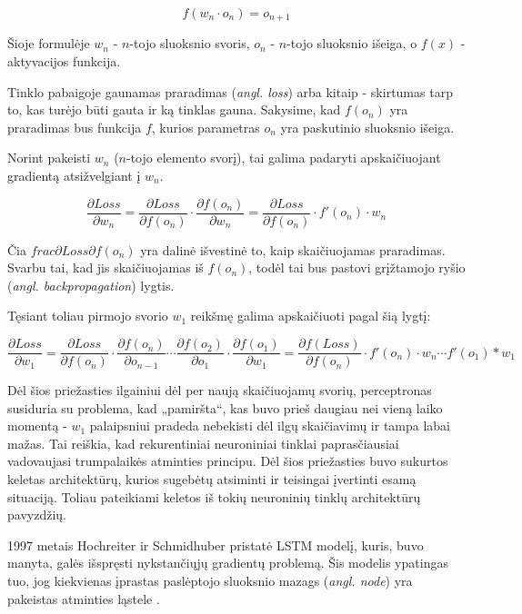 \documentclass{VUMIFPSbakalaurinis}
\begin{document}
\begin{equation}
	f(w_n \cdot o_n)=o_{n+1}
\end{equation}

Šioje formulėje $w_n$ - $n$-tojo sluoksnio svoris, $o_n$ - $n$-tojo sluoksnio išeiga, o $f(x)$ - aktyvacijos funkcija.

Tinklo pabaigoje gaunamas praradimas (\textit{angl. loss}) arba kitaip - skirtumas tarp to, kas turėjo būti gauta ir ką tinklas gauna. Sakysime, kad $f(o_n)$ yra praradimas bus funkcija $f$, kurios parametras $o_n$ yra paskutinio sluoksnio išeiga.

Norint pakeisti $w_n$ ($n$-tojo elemento svorį), tai galima padaryti apskaičiuojant gradientą atsižvelgiant į $w_n$.

\begin{equation}
	\frac{\partial Loss}{\partial w_n} = \frac{\partial Loss}{\partial f(o_n)} \cdot \frac{\partial f(o_n)}{\partial w_n} = \frac{\partial Loss}{\partial f(o_n)} \cdot f'(o_n) \cdot w_n
\end{equation}

Čia $frac{\partial Loss}{\partial f(o_n)}$ yra dalinė išvestinė to, kaip skaičiuojamas praradimas. Svarbu tai, kad jis skaičiuojamas iš $f(o_n)$, todėl tai bus pastovi grįžtamojo ryšio (\textit{angl. backpropagation}) lygtis.

Tęsiant toliau pirmojo svorio $w_1$ reikšmę galima apskaičiuoti pagal šią lygtį:

\begin{equation}
\frac{\partial Loss}{\partial w_1} = \frac{\partial Loss}{\partial f(o_n)} \cdot \frac{\partial f(o_n)}{\partial o_{n-1}} \cdots \frac{\partial f(o_2)}{\partial o_1} \cdot \frac{\partial f(o_1)}{\partial w_1} = \frac{\partial f(Loss)}{\partial f(o_n)} \cdot f'(o_n) \cdot w_n \cdots f'(o_1) * w_1
\end{equation}

Dėl šios priežasties ilgainiui dėl per naują skaičiuojamų svorių, perceptronas susiduria su problema, kad „pamiršta“, kas buvo prieš daugiau nei vieną laiko momentą - $w_1$ palaipsniui pradeda nebekisti dėl ilgų skaičiavimų ir tampa labai mažas. Tai reiškia, kad rekurentiniai neuroniniai tinklai paprasčiausiai vadovaujasi trumpalaikės atminties principu. Dėl šios priežasties buvo sukurtos keletas architektūrų, kurios sugebėtų atsiminti ir teisingai įvertinti esamą situaciją. Toliau pateikiami keletos iš tokių neuroninių tinklų architektūrų pavyzdžių.

1997 metais Hochreiter ir Schmidhuber pristatė LSTM modelį, kuris, buvo manyta, galės išspręsti nykstančiųjų gradientų problemą. Šis modelis ypatingas tuo, jog kiekvienas įprastas paslėptojo sluoksnio mazags (\textit{angl. node}) yra pakeistas atminties ląstele \cite{DBLP:journals/corr/Lipton15}.
\end{document}
